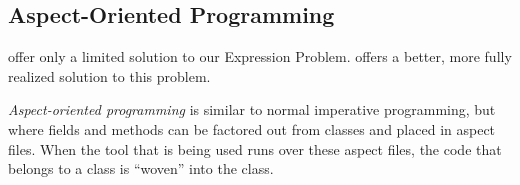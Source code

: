\subsection{Aspect-Oriented Programming}\label{subsec:Aspect_Oriented_Programming}
 offer only a limited solution to our Expression Problem.
 offers a better, more fully realized solution to this problem.

\begin{definition}\label{def:Aspect_Oriented_Programming}
  \emph{Aspect-oriented programming} is similar to normal imperative programming, but where fields and methods can be factored out from classes and placed in aspect files.
  When the tool that is being used runs over these aspect files, the code that belongs to a class is ``woven'' into the class.

  \begin{remark}
    
  \end{remark}
\end{definition}
